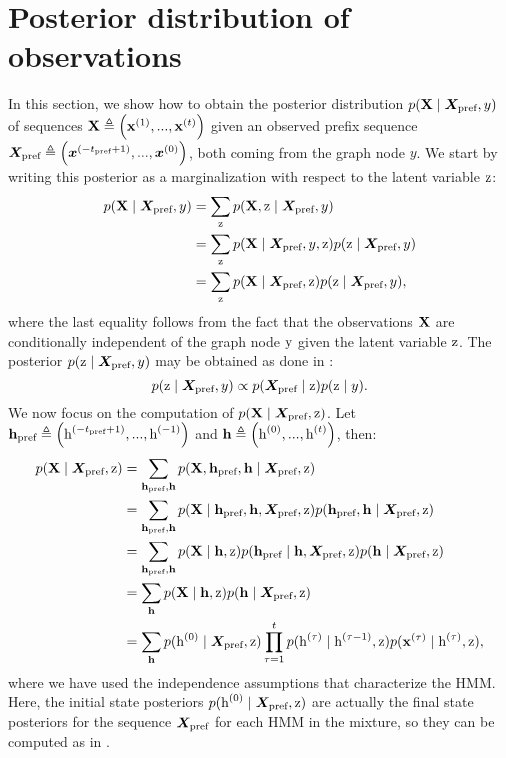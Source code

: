 \section{Posterior distribution of observations}
\label{sec:posterior_proof}
In this section, we show how to obtain the posterior distribution $p({\mathbf{X}} \mid {\bm{X}}_\text{pref}, y)$ of sequences ${\mathbf{X}} \triangleq \left({\mathbf{x}}^{(1)}, ...,{\mathbf{x}}^{(t)}\right)$ given an observed prefix sequence ${\bm{X}}_\text{pref} \triangleq \left({\bm{x}}^{(-t_\text{pref}+1)}, ...,{\bm{x}}^{(0)}\right)$, both coming from the graph node $y$. We start by writing this posterior as a marginalization with respect to the latent variable ${\textnormal{z}}$:
\begin{align}
\label{mhmm_posterior}
p({\mathbf{X}} \mid {\bm{X}}_\text{pref}, y) &= \sum_{{\textnormal{z}}} p({\mathbf{X}}, {\textnormal{z}} \mid {\bm{X}}_\text{pref}, y)\nonumber\\
&= \sum_{{\textnormal{z}}} p({\mathbf{X}} \mid {\bm{X}}_\text{pref}, y, {\textnormal{z}}) p({\textnormal{z}} \mid {\bm{X}}_\text{pref}, y) \nonumber\\
&= \sum_{{\textnormal{z}}} p({\mathbf{X}} \mid {\bm{X}}_\text{pref}, {\textnormal{z}}) p({\textnormal{z}} \mid {\bm{X}}_\text{pref}, y),
\end{align}
where the last equality follows from the fact that the observations ${\mathbf{X}}$ are conditionally independent of the graph node ${\textnormal{y}}$ given the latent variable ${\textnormal{z}}$. The posterior $p({\textnormal{z}} \mid {\bm{X}}_\text{pref}, y)$ may be obtained as done in :
\begin{equation}
p({\textnormal{z}} \mid {\bm{X}}_\text{pref}, y) \propto p({\bm{X}}_\text{pref} \mid {\textnormal{z}})p({\textnormal{z}} \mid y).
\end{equation}
We now focus on the computation of $p({\mathbf{X}} \mid {\bm{X}}_\text{pref}, {\textnormal{z}})$. Let ${\mathbf{h}}_\text{pref} \triangleq \left({\textnormal{h}}^{(-t_\text{pref}+1)}, ...,{\textnormal{h}}^{(-1)}\right)$ and ${\mathbf{h}} \triangleq \left({\textnormal{h}}^{(0)}, ...,{\textnormal{h}}^{(t)}\right)$, then:
\begin{align}
p({\mathbf{X}} \mid {\bm{X}}_\text{pref}, {\textnormal{z}}) &= \sum_{{\mathbf{h}}_\text{pref}, {\mathbf{h}}} p({\mathbf{X}}, {\mathbf{h}}_\text{pref}, {\mathbf{h}} \mid {\bm{X}}_\text{pref}, {\textnormal{z}}) \nonumber\\
&= \sum_{{\mathbf{h}}_\text{pref}, {\mathbf{h}}} p({\mathbf{X}} \mid {\mathbf{h}}_\text{pref}, {\mathbf{h}}, {\bm{X}}_\text{pref}, {\textnormal{z}}) p({\mathbf{h}}_\text{pref}, {\mathbf{h}} \mid {\bm{X}}_\text{pref}, {\textnormal{z}}) \nonumber\\
&= \sum_{{\mathbf{h}}_\text{pref}, {\mathbf{h}}} p({\mathbf{X}} \mid {\mathbf{h}}, {\textnormal{z}}) p({\mathbf{h}}_\text{pref} \mid {\mathbf{h}}, {\bm{X}}_\text{pref}, {\textnormal{z}}) p({\mathbf{h}} \mid {\bm{X}}_\text{pref}, {\textnormal{z}}) \nonumber\\
&= \sum_{{\mathbf{h}}} p({\mathbf{X}} \mid {\mathbf{h}}, {\textnormal{z}}) p({\mathbf{h}} \mid {\bm{X}}_\text{pref}, {\textnormal{z}}) \nonumber\\
&= \sum_{{\mathbf{h}}} p({\textnormal{h}}^{(0)} \mid {\bm{X}}_\text{pref}, {\textnormal{z}}) \prod_{\tau=1}^{t} p({\textnormal{h}}^{(\tau)} \mid {\textnormal{h}}^{(\tau-1)}, {\textnormal{z}}) p({\mathbf{x}}^{(\tau)} \mid {\textnormal{h}}^{(\tau)}, {\textnormal{z}}),
\end{align}
where we have used the independence assumptions that characterize the HMM. Here, the initial state posteriors $p({\textnormal{h}}^{(0)} \mid {\bm{X}}_\text{pref}, {\textnormal{z}})$ are actually the final state posteriors for the sequence ${\bm{X}}_\text{pref}$ for each HMM in the mixture, so they can be computed as in .

